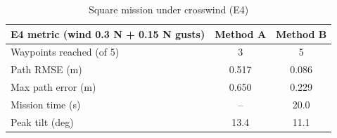 \begin{table}[h]
\centering
\caption{Square mission under crosswind (E4)}
\label{tab:e4}
\begin{tabular}{|p{8.2cm}|c|c|}
\hline
\textbf{E4 metric (wind 0.3 N + 0.15 N gusts)} & \textbf{Method A} & \textbf{Method B} \\ \hline
Waypoints reached (of 5) & 3 & 5 \\ \hline
Path RMSE (m) & 0.517 & 0.086 \\ \hline
Max path error (m) & 0.650 & 0.229 \\ \hline
Mission time (s) & -- & 20.0 \\ \hline
Peak tilt (deg) & 13.4 & 11.1 \\ \hline
\end{tabular}
\end{table}
